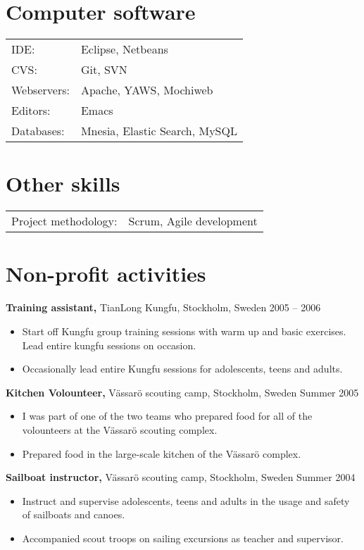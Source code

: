 \documentclass[margin]{res}
\begin{document}
\begin{resume}
\section{Computer software}
\begin{tabular}{l p{3in}}
	IDE: & Eclipse, Netbeans \\
	CVS: & Git, SVN \\
	Webservers: & Apache, YAWS, Mochiweb \\
	Editors: & Emacs \\
	Databases: & Mnesia, Elastic Search, MySQL
\end{tabular}

\section{Other skills}
\begin{tabular}{l p{3in}}
	Project methodology: & Scrum, Agile development
\end{tabular}

\section{Non-profit activities}
{\bf Training assistant,} TianLong Kungfu, Stockholm, Sweden \hfill 2005 -- 2006
\begin{itemize} \itemsep -2pt
\item Start off Kungfu group training sessions with warm up and basic exercises. Lead entire kungfu sessions on occasion.
\item Occasionally lead entire Kungfu sessions for adolescents, teens and adults.
\end{itemize}

{\bf Kitchen Volounteer,} Vässarö scouting camp, Stockholm, Sweden \hfill Summer 2005
\begin{itemize} \itemsep -2pt
\item I was part of one of the two teams who prepared food for all of the volounteers at the Vässarö scouting complex.
\item Prepared food in the large-scale kitchen of the Vässarö complex.
\end{itemize}

{\bf Sailboat instructor,} Vässarö scouting camp, Stockholm, Sweden \hfill Summer 2004
\begin{itemize} \itemsep -2pt
\item Instruct and supervise adolescents, teens and adults in the usage and safety of sailboats and canoes.
\item Accompanied scout troops on sailing excursions as teacher and supervisor.
\end{itemize}


\end{resume}
\end{document}
